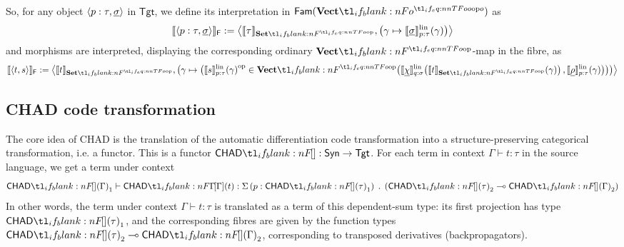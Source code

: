 \documentclass[11pt,a4paper]{article}
\theoremstyle{definition}
\theoremstyle{remark}
\providecommand{\Syn}{\mathsf{Syn}}
\providecommand{\Fam}[1]{\mathsf{Fam}(#1)}
\providecommand{\lintype}[1]{\underline{#1}}
\providecommand{\setint}[1]{\llbracket #1\rrbracket_{\Set}}
\providecommand{\fvoint}[1]{\llbracket #1\rrbracket_{\cat[]{F}}}
\providecommand{\linint}[2]{\llbracket #1\rrbracket_{#2}^{\mathrm{lin}}}
\providecommand{\linto}{\multimap}
\providecommand{\Tgt}{\mathsf{Tgt}}
\begin{document}
So, for any object \( \tuple{ p : \tau, \lintype{\sigma} } \) in \( \Tgt \), we define its interpretation in \( \Fam{\Vect[o]} \) as
\begin{equation}
  \label{eq:target-language-fam-vectop-interpretation-objects}
  \fvoint{\tuple{ p : \tau, \lintype{\sigma} }} :=
  \tuple{
    \setint{\tau},
    \left(
    \gamma \mapsto
    \fn[n]{
    \linint{\lintype{\sigma}}{p : \tau}
    }{ \gamma }
    \right)
  }
\end{equation}
and morphisms are interpreted, displaying the corresponding ordinary \(\Vect\)-map in the fibre, as
\begin{equation}
  \label{eq:target-language-fam-vectop-interpretation-morphisms}
  \fvoint{\tuple{ t, s }} :=
  \tuple{
    \setint{t},
    \left(
      \gamma \mapsto
      \left(
        \opmor[p]{
          \fn[n]{ \linint{s}{p : \tau} }{ \gamma }
        }
        \in
        \fn[n]{ \Vect }{
          \fn[n]{ \linint{\lintype{\chi}}{q : \sigma} }{ \fn[n]{ \setint{t} }{ \gamma } },
          \fn[n]{ \linint{\lintype{\rho}}{p : \tau} }{ \gamma }
        }
      \right)
    \right)
  }
\end{equation}

\subsection{CHAD code transformation}

The core idea of CHAD is the translation of the automatic differentiation code transformation into a structure-preserving categorical transformation, i.e. a functor. This is a functor \( \chad: \Syn \to \Tgt \). For each term in context \( \Gamma \vdash t : \tau \) in the source language, we get a term under context
\begin{equation}
  \label{eq:chad-code-transformation-terms-under-context}
  \Fun[np]{ \chad }{ \Gamma }_{1}
  \vdash
  \Fun[np]{ \chad[\Gamma] }{ t } :
  \Sigma \left(
    p :
    \Fun[np]{ \chad }{ \tau }_{1}
  \right)
  \; . \;
  \left(
  \Fun[np]{ \chad }{ \tau }_{2}
  \linto
  \Fun[np]{ \chad }{ \Gamma }_{2}
  \right)
\end{equation}
In other words, the term under context \( \Gamma \vdash t : \tau \) is translated as a term of this dependent-sum type: its first projection has type \( \Fun[np]{ \chad }{ \tau }_{1} \), and the corresponding fibres are given by the function types \( \Fun[np]{ \chad }{ \tau }_{2} \linto \Fun[np]{ \chad }{ \Gamma }_{2} \), corresponding to transposed derivatives (backpropagators).
\end{document}

